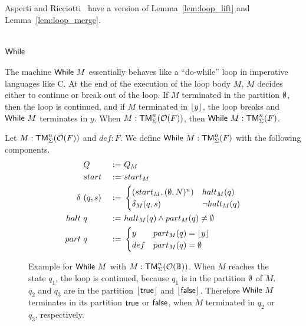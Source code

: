 Asperti and Ricciotti~\cite{asperti2015} have a version of Lemma~\ref{lem:loop_lift} and Lemma~\ref{lem:loop_merge}.

\section{$\mathsf{While}$}
\label{sec:While}


The machine $\mathsf{While}~M$ essentially behaves like a ``do-while'' loop in imperative languages like C.  At the end of the execution of the loop body $M$,
$M$ decides either to continue or break out of the loop.  If $M$ terminated in the partition $\emptyset$, then the loop is continued, and if $M$
terminated in $\left\lfloor {y} \right\rfloor$, the loop breaks and $\mathsf{While}~M$ terminates in $y$.  When $M : \mathsf{TM}_\Sigma^n(\mathcal{O}(F))$, then $\mathsf{While}~M : \mathsf{TM}_\Sigma^n(F)$.

\begin{definition}[$\MS{While}~M$]
  \label{def:While}
  Let $M : \mathsf{TM}_\Sigma^n(\mathcal{O}(F))$ and $def:F$.  We define $\mathsf{While}~M : \mathsf{TM}_\Sigma^n(F)$ with the following components.
  \begin{alignat*}{3}
    & Q              &~:=~& Q_M \\
    & start          &~:=~& start_M \\
    \delta ~& (q, s) &~:=~&
    \begin{cases}
      (start_M, (\emptyset, N)^n) & halt_M(q) \\
      \delta_M (q,s)    & \lnot halt_M(q)
    \end{cases} \\
    halt ~& q      &~:=~& halt_M(q) \land part_M(q) \neq \emptyset \\
    part ~& q      &~:=~&
    \begin{cases}
      y   & part_M(q) = \left\lfloor {y} \right\rfloor \\
      def & part_M(q) = \emptyset
    \end{cases}
  \end{alignat*}
\end{definition}

\begin{figure}
  \center
  
  \caption{Example for $\mathsf{While}~M$ with $M:\mathsf{TM}_\Sigma^n(\mathcal{O}(\mathbb{B}))$.  When $M$ reaches the state $q_1$, the loop is continued, because $q_1$ is in
    the partition $\emptyset$ of $M$.  $q_2$ and $q_3$ are in the partition $\left\lfloor {\ensuremath{\mathsf{true}}} \right\rfloor$ and $\left\lfloor {\ensuremath{\mathsf{false}}} \right\rfloor$.  Therefore $\mathsf{While}~M$ terminates in its
    partition $\mathsf{true}$ or $\mathsf{false}$, when $M$ terminated in $q_2$ or $q_3$, respectively.}
  \label{fig:while-example}
\end{figure}

